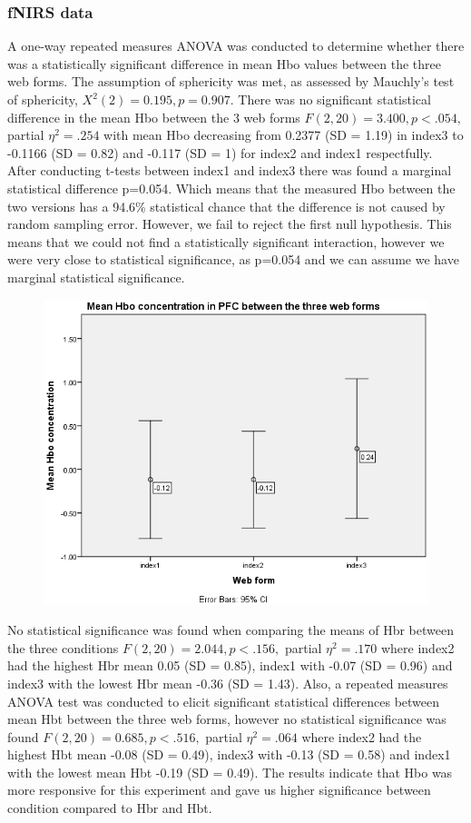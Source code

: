 \documentclass[a4paper]{report}
\begin{document}
			\subsubsection{fNIRS data}	
			A one-way repeated measures ANOVA was conducted to determine whether there was a statistically significant difference in mean Hbo values between the three web forms. The assumption of sphericity was met, as assessed by Mauchly's test of sphericity, $X^{2}(2) = 0.195, p = 0.907$. There was no significant statistical difference in the mean Hbo between the 3 web forms  $F(2,20)=3.400, p<.054,$ partial $\eta^{2}=.254$ with mean Hbo decreasing from 0.2377 (SD = 1.19) in index3 to -0.1166 (SD = 0.82) and -0.117 (SD = 1) for index2 and index1 respectfully.
			After conducting t-tests between index1 and index3 there was found a marginal statistical difference p=0.054. Which means that the measured Hbo between the two versions has a 94.6\% statistical chance that the difference is not caused by random sampling error. However, we fail to reject the first null hypothesis. This means that we could not find a statistically significant interaction, however we were very close to statistical significance, as p=0.054 and we can assume we have marginal statistical significance.
				\begin{figure}[h]
					\centering
					\includegraphics[width=0.7\linewidth]{mean-hbo-index123}
					\caption[Mean oxygenated hemoglobin between the three web forms]{}
					\label{fig:mean-hbo-index123}
				\end{figure}	
			No statistical significance was found when comparing the means of Hbr between the three conditions $F(2,20)=2.044, p<.156,$ partial $\eta^{2}=.170$ where index2 had the highest Hbr mean 0.05 (SD = 0.85), index1 with -0.07 (SD = 0.96) and index3 with the lowest Hbr mean -0.36 (SD = 1.43). Also, a repeated measures ANOVA test was conducted to elicit significant statistical differences between mean Hbt between the three web forms, however no statistical significance was found $F(2,20)=0.685, p<.516,$ partial $\eta^{2}=.064$ where index2 had the highest Hbt mean -0.08 (SD = 0.49), index3 with -0.13 (SD = 0.58) and index1 with the lowest mean Hbt -0.19 (SD = 0.49). The results indicate that Hbo was more responsive for this experiment and gave us higher significance between condition compared to Hbr and Hbt.
\end{document}
